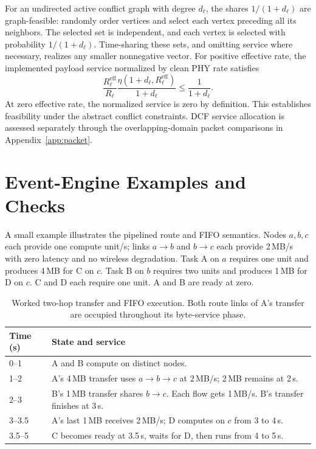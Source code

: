 For an undirected active conflict graph with degree $d_\ell$, the shares
$1/(1+d_\ell)$ are graph-feasible: randomly order vertices and select
each vertex preceding all its neighbors. The selected set is independent,
and each vertex is selected with probability $1/(1+d_\ell)$.
Time-sharing these sets, and omitting service where necessary, realizes
any smaller nonnegative vector. For positive effective rate, the implemented
payload service normalized by clean PHY rate satisfies
\begin{equation}
\frac{R_\ell^{\mathrm{eff}}}{R_\ell}
\frac{\eta(1+d_\ell,R_\ell^{\mathrm{eff}})}{1+d_\ell}
\leq\frac{1}{1+d_\ell}.
\end{equation}
At zero effective rate, the normalized service is zero by definition.
This establishes feasibility under the abstract conflict constraints.
DCF service allocation is assessed separately through the overlapping-domain
packet comparisons in Appendix~\ref{app:packet}.

\section{Event-Engine Examples and Checks}
\label{app:engine}

A small example illustrates the pipelined route and FIFO semantics. Nodes
$a,b,c$ each provide one compute unit/s; links $a\to b$ and $b\to c$
each provide 2\,MB/s with zero latency and no wireless degradation.
Task A on $a$ requires one unit and produces 4\,MB for C on $c$.
Task B on $b$ requires two units and produces 1\,MB for D on $c$.
C and D each require one unit. A and B are ready at zero.

\begin{table}[t]
\centering
\caption{Worked two-hop transfer and FIFO execution. Both route links of
A's transfer are occupied throughout its byte-service phase.}
\label{tab:worked_engine}
\begin{tabular}{lp{5.4cm}}
\toprule
Time (s) & State and service \\
\midrule
0--1 & A and B compute on distinct nodes. \\
1--2 & A's 4\,MB transfer uses $a\to b\to c$ at 2\,MB/s; 2\,MB remains at 2\,s. \\
2--3 & B's 1\,MB transfer shares $b\to c$. Each flow gets 1\,MB/s. B's transfer finishes at 3\,s. \\
3--3.5 & A's last 1\,MB receives 2\,MB/s; D computes on $c$ from 3 to 4\,s. \\
3.5--5 & C becomes ready at 3.5\,s, waits for D, then runs from 4 to 5\,s. \\
\bottomrule
\end{tabular}
\end{table}


